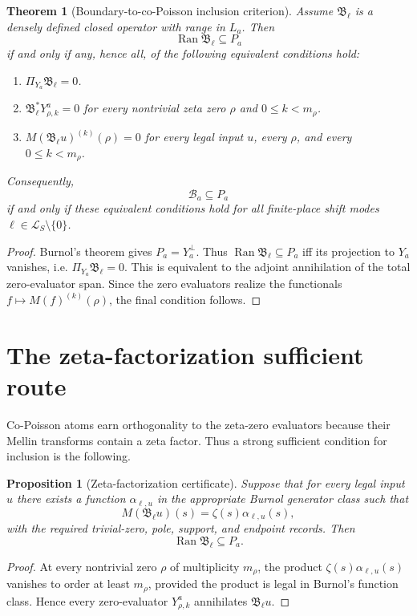 \documentclass[11pt]{article}
\newtheorem{theorem}{Theorem}
\newtheorem{proposition}{Proposition}
\begin{document}
\begin{theorem}[Boundary-to-co-Poisson inclusion criterion]
Assume $\mathfrak B_\ell$ is a densely defined closed operator with range in $L_a$.  Then
\[
  \operatorname{Ran}\mathfrak B_\ell\subseteq P_a
\]
if and only if any, hence all, of the following equivalent conditions hold:
\begin{enumerate}[label=(\roman*)]
\item $\Pi_{Y_a}\mathfrak B_\ell=0$.
\item $\mathfrak B_\ell^*Y^a_{\rho,k}=0$ for every nontrivial zeta zero $\rho$ and $0\le k<m_\rho$.
\item $M(\mathfrak B_\ell u)^{(k)}(\rho)=0$ for every legal input $u$, every $\rho$, and every $0\le k<m_\rho$.
\end{enumerate}
Consequently,
\[
  \mathcal B_a\subseteq P_a
\]
if and only if these equivalent conditions hold for all finite-place shift modes $\ell\in\mathcal L_S\setminus\{0\}$.
\end{theorem}

\begin{proof}
Burnol's theorem gives $P_a=Y_a^\perp$.  Thus $\operatorname{Ran}\mathfrak B_\ell\subseteq P_a$ iff its projection to $Y_a$ vanishes, i.e. $\Pi_{Y_a}\mathfrak B_\ell=0$.  This is equivalent to the adjoint annihilation of the total zero-evaluator span.  Since the zero evaluators realize the functionals $f\mapsto M(f)^{(k)}(\rho)$, the final condition follows.
\end{proof}

\section{The zeta-factorization sufficient route}
Co-Poisson atoms earn orthogonality to the zeta-zero evaluators because their Mellin transforms contain a zeta factor.  Thus a strong sufficient condition for inclusion is the following.

\begin{proposition}[Zeta-factorization certificate]
Suppose that for every legal input $u$ there exists a function $\alpha_{\ell,u}$ in the appropriate Burnol generator class such that
\[
  M(\mathfrak B_\ell u)(s)=\zeta(s)\alpha_{\ell,u}(s),
\]
with the required trivial-zero, pole, support, and endpoint records.  Then
\[
  \operatorname{Ran}\mathfrak B_\ell\subseteq P_a.
\]
\end{proposition}

\begin{proof}
At every nontrivial zero $\rho$ of multiplicity $m_\rho$, the product $\zeta(s)\alpha_{\ell,u}(s)$ vanishes to order at least $m_\rho$, provided the product is legal in Burnol's function class.  Hence every zero-evaluator $Y^a_{\rho,k}$ annihilates $\mathfrak B_\ell u$.
\end{proof}
\end{document}
